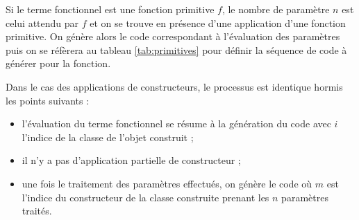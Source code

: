 Si le terme fonctionnel est une fonction
primitive $f$, le nombre de param\`etre $n$ est celui attendu par
$f$ et on se trouve en
pr\'esence d'une application d'une fonction primitive. On g\'en\`ere alors
le code correspondant \`a l'\'evaluation des param\`etres puis on se r\'ef\`erera
au tableau \ref{tab:primitives} pour d\'efinir la s\'equence de code
\`a g\'en\'erer pour la fonction. 

Dans le cas des applications de constructeurs, le processus est
identique hormis les points suivants :
\begin{itemize}
  \item l'\'evaluation du terme fonctionnel se r\'esume \`a la g\'en\'eration du
    code  avec $i$ l'indice de la classe de
    l'objet construit ;
  \item il n'y a pas d'application partielle de constructeur ;
  \item une fois le traitement des param\`etres effectu\'es, on g\'en\`ere le
    code  o\`u $m$ est l'indice du
    constructeur de la classe construite prenant les $n$ param\`etres
    trait\'es.
\end{itemize}


